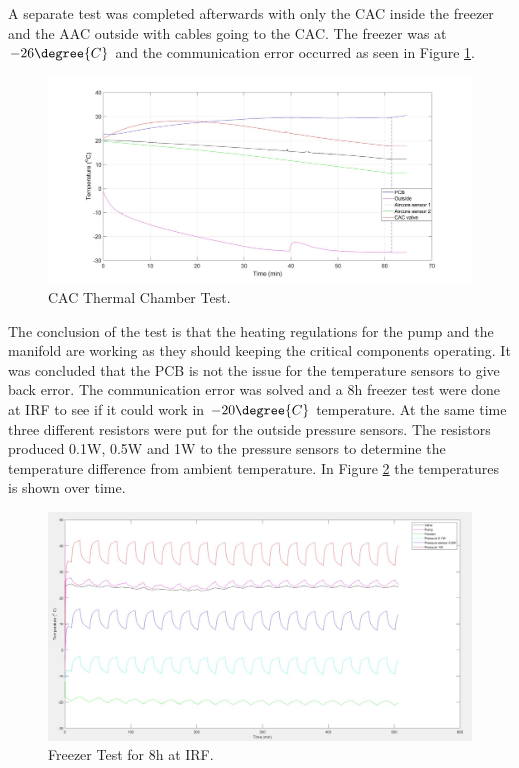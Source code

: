 \documentclass[a4paper,12pt,oneside]{article}
\begin{document}
\begin{appendices}
A separate test was completed afterwards with only the CAC inside the freezer and the AAC outside with cables going to the CAC. The freezer was at $-26\degree{C}$ and the communication error occurred as seen in Figure \ref{fig:CAC-thermal-chamber}.

\begin{figure}[H]
    \centering
    \includegraphics[width=\linewidth]{appendix/img/test-results/CAC-only-freezer-test.jpg}
    \caption{CAC Thermal Chamber Test.}
    \label{fig:CAC-thermal-chamber}
\end{figure}

The conclusion of the test is that the heating regulations for the pump and the manifold are working as they should keeping the critical components operating. It was concluded that the PCB is not the issue for the temperature sensors to give back error. 
The communication error was solved and a 8h freezer test were done at IRF to see if it could work in $-20\degree{C}$ temperature. At the same time three different resistors were put for the outside pressure sensors. The resistors produced 0.1W, 0.5W and 1W to the pressure sensors to determine the temperature difference from ambient temperature. In Figure \ref{fig:freezer_test_IRF} the temperatures is shown over time.

\begin{figure}[H]
    \centering
    \includegraphics[width=\linewidth]{appendix/img/test-results/Freez-20.JPG}
    \caption{Freezer Test for 8h at IRF.}
    \label{fig:freezer_test_IRF}
\end{figure}


\end{appendices}
\end{document}
